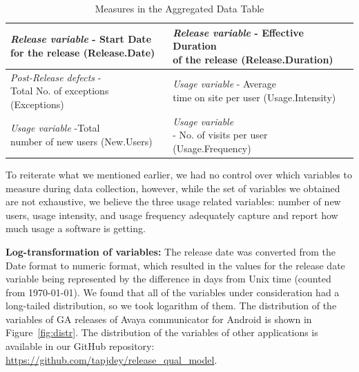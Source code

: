 \documentclass[smallcondensed]{svjour3}     %
\begin{document}
\begin{table}
\caption{Measures in the Aggregated Data Table}\label{t:finalvarss}
\begin{tabular}{|l|l|}\hline
\pbox{6cm}{\textit{Release variable} - Start Date \\for the release (Release.Date)} & \pbox{6cm}{\textit{Release variable} - Effective Duration \\of the release (Release.Duration)}\\\hline
\pbox{6cm}{\textit{Post-Release defects} - \\Total No. of exceptions (Exceptions)}  &  \pbox{6cm}{\textit{Usage variable} - Average\\ time on site per user (Usage.Intensity)}\\\hline
\pbox{6cm}{\textit{Usage variable} -Total\\ number of new users (New.Users)} & \pbox{6cm}{\textit{Usage variable} \\- No. of visits per user (Usage.Frequency)}\\\hline
\end{tabular}
\end{table}

To reiterate what we mentioned earlier, we had no control over which variables to measure during data collection, however, while the set of variables we obtained are not exhaustive, we believe the three usage related variables: number of new users, usage intensity, and usage frequency adequately capture and report how much usage a software is getting. 

\noindent
\textbf{Log-transformation of variables:}
The release date was converted from the Date format to numeric format, which 
resulted in the values for the release date variable being represented by the 
difference in days from Unix time (counted from 1970-01-01).
We found that all of the variables under consideration
had a long-tailed distribution, so we took logarithm of them. 
The distribution of the variables of GA releases of Avaya communicator 
for Android is shown in Figure~\ref{fig:distr}.
The distribution of the variables of other applications  is available in our GitHub repository: \url{https://github.com/tapjdey/release\_qual\_model}.
\end{document}
